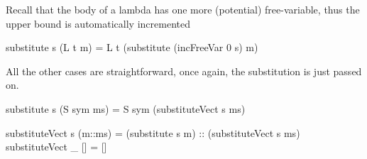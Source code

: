 Recall that the body of a lambda has one more (potential) free-variable, thus the upper bound is
automatically incremented

\begin{code}
substitute s (L t m) = L t (substitute (incFreeVar 0 s) m)
\end{code}

All the other cases are straightforward, once again, the substitution is just passed on.

\begin{code}
substitute s (S sym ms) = S sym (substituteVect s ms)

substituteVect s (m::ms) = (substitute s m) :: (substituteVect s ms)
substituteVect _ [] = []
\end{code}

